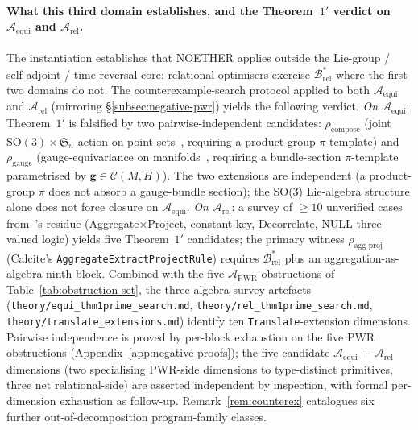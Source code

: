 \documentclass[manuscript]{acmart}
\begin{document}
\paragraph{What this third domain establishes, and the Theorem~$1'$ verdict on $\mathcal{A}_{\mathrm{equi}}$ and $\mathcal{A}_{\mathrm{rel}}$.}
The instantiation establishes that NOETHER applies outside the Lie-group / self-adjoint / time-reversal core: relational optimisers exercise $\mathcal{B}^{*}_{\mathrm{rel}}$ where the first two domains do not. The counterexample-search protocol applied to both $\mathcal{A}_{\mathrm{equi}}$ and $\mathcal{A}_{\mathrm{rel}}$ (mirroring \S\ref{subsec:negative-pwr}) yields the following verdict. \emph{On $\mathcal{A}_{\mathrm{equi}}$}: Theorem~$1'$ is falsified by two pairwise-independent candidates: $\rho_{\mathrm{compose}}$ (joint $\mathrm{SO}(3) \times \mathfrak{S}_n$ action on point sets~\cite{Satorras2021EGNN}, requiring a product-group $\pi$-template) and $\rho_{\mathrm{gauge}}$ (gauge-equivariance on manifolds~\cite{Cohen2019Gauge}, requiring a bundle-section $\pi$-template parametrised by $\mathbf{g} \in \mathcal{C}(M,H)$). The two extensions are independent (a product-group $\pi$ does not absorb a gauge-bundle section); the SO(3) Lie-algebra structure alone does not force closure on $\mathcal{A}_{\mathrm{equi}}$. \emph{On $\mathcal{A}_{\mathrm{rel}}$}: a survey of $\ge 10$ unverified cases from~\cite{Wang2024QED}'s residue (Aggregate$\times$Project, constant-key, Decorrelate, NULL three-valued logic) yields five Theorem~$1'$ candidates; the primary witness $\rho_{\mathrm{agg\text{-}proj}}$ (Calcite's \texttt{AggregateExtractProjectRule}) requires $\mathcal{B}^{*}_{\mathrm{rel}}$ plus an aggregation-as-algebra ninth block. Combined with the five $\mathcal{A}_{\mathrm{PWR}}$ obstructions of Table~\ref{tab:obstruction set}, the three algebra-survey artefacts (\texttt{theory/equi\_thm1prime\_search.md}, \texttt{theory/rel\_thm1prime\_search.md}, \texttt{theory/translate\_extensions.md}) identify ten \texttt{Translate}-extension dimensions. Pairwise independence is proved by per-block exhaustion on the five PWR obstructions (Appendix~\ref{app:negative-proofs}); the five candidate $\mathcal{A}_{\mathrm{equi}}$ + $\mathcal{A}_{\mathrm{rel}}$ dimensions (two specialising PWR-side dimensions to type-distinct primitives, three net relational-side) are asserted independent by inspection, with formal per-dimension exhaustion as follow-up. Remark~\ref{rem:counterex} catalogues six further out-of-decomposition program-family classes.
\end{document}
